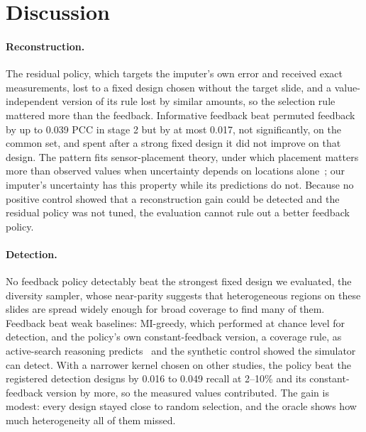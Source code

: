 \documentclass[10pt]{article}
\begin{document}
\section{Discussion}

\paragraph{Reconstruction.} The residual policy, which targets the imputer's own error and received exact
measurements, lost to a fixed design chosen without the target slide, and a value-independent version of its rule
lost by similar amounts, so the selection rule mattered more than the feedback. Informative feedback beat permuted
feedback by up to 0.039 PCC in stage 2 but by at most 0.017, not significantly, on the common set, and spent after a
strong fixed design it did not improve on that design. The pattern fits sensor-placement theory, under which
placement matters more than observed values when uncertainty depends on locations alone~\citep{krause2008near}; our
imputer's uncertainty has this property while its predictions do not. Because no positive control showed that a
reconstruction gain could be detected and the residual policy was not tuned, the evaluation cannot rule out a
better feedback policy.

\paragraph{Detection.} No feedback policy detectably beat the strongest fixed design we evaluated, the diversity
sampler, whose near-parity suggests that heterogeneous regions on these slides are spread widely enough for broad
coverage to find many of them. Feedback beat weak baselines: MI-greedy, which performed at chance level for
detection, and the policy's own constant-feedback version, a coverage rule, as active-search reasoning
predicts~\citep{garnett2012bayesian} and the synthetic control showed the simulator can detect. With a narrower
kernel chosen on other studies, the policy beat the registered detection designs by 0.016 to 0.049 recall at
2--10\% and its constant-feedback version by more, so the measured values contributed. The gain is modest: every
design stayed close to random selection, and the oracle shows how much heterogeneity all of them missed.
\end{document}
